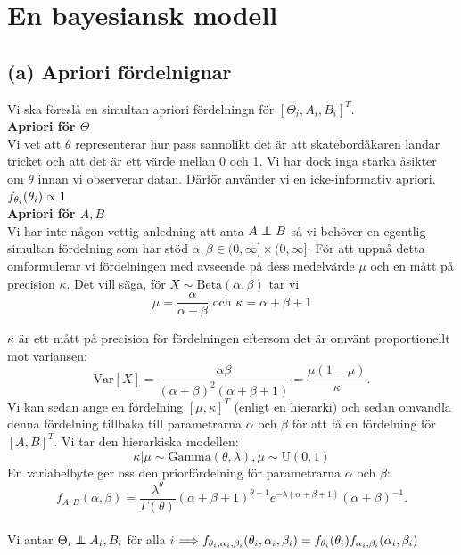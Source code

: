 \documentclass{assignment}
\begin{document}
\newpage 
\section{En bayesiansk modell}
\subsection*{(a) Apriori fördelnignar}
Vi ska föreslå en simultan apriori fördelningn för $[\Theta_i,A_i,B_i]^T$.
\\ \textbf{Apriori för $\Theta$}
\\ Vi vet att $\theta$ representerar hur pass sannolikt det är att skatebordåkaren landar tricket och att det är ett värde mellan 0 och 1. 
Vi har dock inga starka åsikter om $\theta$ innan vi observerar datan. Därför använder vi en
icke-informativ apriori.
\\ $f_{\theta_i}(\theta_i)\propto 1$
\\ \textbf{Apriori för $A,B$}
\\ Vi har inte någon vettig anledning att anta $A\perp\!\!\!\!\perp B$ så vi behöver en egentlig simultan fördelning
som har stöd $\alpha,\beta \in (0,\infty]\times (0,\infty]$.
För att uppnå detta omformulerar vi fördelningen med avseende på dess medelvärde $\mu$ och en mått på precision $\kappa$. Det vill säga, för $X\sim\mathrm{Beta}(\alpha, \beta)$ tar vi
$$\mu = \frac{\alpha}{\alpha + \beta} \text{ och } \kappa = \alpha + \beta + 1$$

$\kappa$ är ett mått på precision för fördelningen eftersom det är omvänt proportionellt mot variansen:
$$
\mathrm{Var}[X] = \frac{\alpha\beta}{(\alpha + \beta)^2(\alpha + \beta + 1)} = \frac{\mu(1 - \mu)}{\kappa}.
$$
Vi kan sedan ange en fördelning $[\mu, \kappa]^T$ (enligt en hierarki) och sedan omvandla denna
fördelning tillbaka till parametrarna $\alpha$ och $\beta$ för att få en fördelning för $[A, B]^T$.
Vi tar den hierarkiska modellen:
$$\kappa | \mu \sim \mathrm{Gamma}(\theta, \lambda),\mu \sim \mathrm{U}(0,1)$$
En variabelbyte ger oss den priorfördelning för parametrarna $\alpha$ och $\beta$:
$$f_{A, B}(\alpha, \beta) = \frac{\lambda^\theta}{\Gamma(\theta)}(\alpha + \beta + 1)^{\theta - 1}e^{-\lambda(\alpha + \beta + 1)}(\alpha + \beta)^{-1}.$$
\\Vi antar $\Theta_i \perp\!\!\!\!\perp A_i,B_i$ för alla $i$ $\Longrightarrow f_{\theta_i,\alpha_i,\beta_i}(\theta_i,\alpha_i,\beta_i) = f_{\theta_i}(\theta_i)f_{\alpha_i,\beta_i}(\alpha_i,\beta_i)$ 
\end{document}
